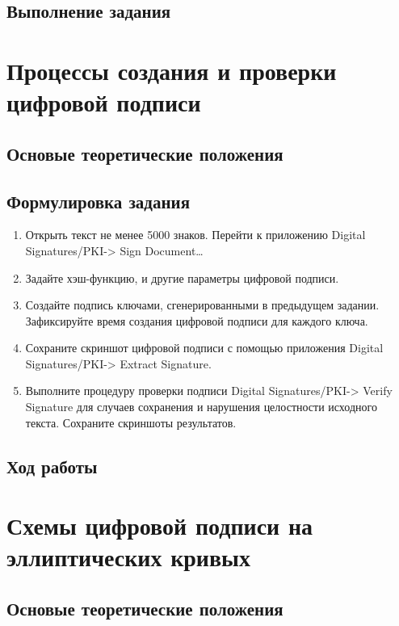 \documentclass[a4paper, 14pt]{extarticle}
\begin{document}
\subsection{Выполнение задания}
\lipsum[1] %

\section{Процессы создания и проверки цифровой подписи}
\subsection{Основые теоретические положения}
\lipsum[1] %

\subsection{Формулировка задания}
\begin{enumerate}
    \item Открыть текст не менее 5000 знаков. Перейти к приложению Digital Signatures/PKI-> Sign Document…
    \item Задайте хэш-функцию, и другие параметры цифровой подписи.
    \item Создайте подпись ключами, сгенерированными в предыдущем задании. Зафиксируйте время создания цифровой подписи для каждого ключа.
    \item Сохраните скриншот цифровой подписи с помощью приложения Digital Signatures/PKI-> Extract Signature.
    \item Выполните процедуру проверки подписи Digital Signatures/PKI-> Verify Signature для случаев сохранения и нарушения целостности исходного текста. Сохраните скриншоты результатов.
\end{enumerate}

\subsection{Ход работы}
\lipsum[1] %

\section{Схемы цифровой подписи на эллиптических кривых}
\subsection{Основые теоретические положения}
\lipsum[1] %
\end{document}
